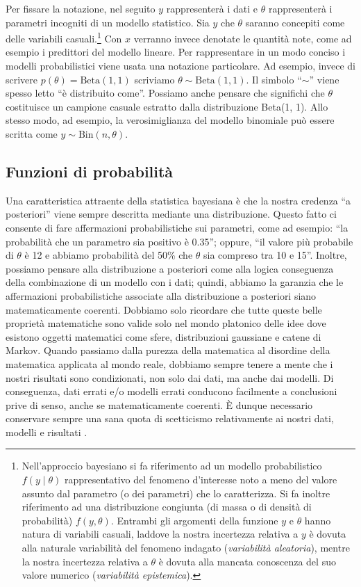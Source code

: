 \documentclass[
  11pt,
]{krantz}
\theoremstyle{definition}
\theoremstyle{definition}
\theoremstyle{definition}
\theoremstyle{definition}
\theoremstyle{remark}
\begin{document}
Per fissare la notazione, nel seguito \(y\) rappresenterà i dati e \(\theta\) rappresenterà i parametri incogniti di un modello statistico. Sia \(y\) che \(\theta\) saranno concepiti come delle variabili casuali.\footnote{Nell'approccio bayesiano si fa riferimento ad un modello probabilistico \(f(y \mid \theta)\) rappresentativo del fenomeno d'interesse noto a meno del valore assunto dal parametro (o dei parametri) che lo caratterizza. Si fa inoltre riferimento ad una distribuzione congiunta (di massa o di densità di probabilità) \(f(y, \theta)\). Entrambi gli argomenti della funzione \(y\) e \(\theta\) hanno natura di variabili casuali, laddove la nostra incertezza relativa a \(y\) è dovuta alla naturale variabilità del fenomeno indagato (\emph{variabilità aleatoria}), mentre la nostra incertezza relativa a \(\theta\) è dovuta alla mancata conoscenza del suo valore numerico (\emph{variabilità epistemica}).} Con \(x\) verranno invece denotate le quantità note, come ad esempio i predittori del modello lineare. Per rappresentare in un modo conciso i modelli probabilistici viene usata una notazione particolare. Ad esempio, invece di scrivere \(p(\theta) = \mbox{Beta}(1, 1)\) scriviamo \(\theta \sim \mbox{Beta}(1, 1)\). Il simbolo ``\(\sim\)'' viene spesso letto ``è distribuito come''. Possiamo anche pensare che significhi che \(\theta\) costituisce un campione casuale estratto dalla distribuzione Beta(1, 1). Allo stesso modo, ad esempio, la verosimiglianza del modello binomiale può essere scritta come \(y \sim \text{Bin}(n, \theta)\).

\hypertarget{funzioni-di-probabilituxe0}{%
\subsection{Funzioni di probabilità}\label{funzioni-di-probabilituxe0}}

Una caratteristica attraente della statistica bayesiana è che la nostra credenza ``a posteriori'' viene sempre descritta mediante una distribuzione. Questo fatto ci consente di fare affermazioni probabilistiche sui parametri, come ad esempio: ``la probabilità che un parametro sia positivo è 0.35''; oppure, ``il valore più probabile di \(\theta\) è 12 e abbiamo probabilità del 50\% che \(\theta\) sia compreso tra 10 e 15''. Inoltre, possiamo pensare alla distribuzione a posteriori come alla logica conseguenza della combinazione di un modello con i dati; quindi, abbiamo la garanzia che le affermazioni probabilistiche associate alla distribuzione a posteriori siano matematicamente coerenti. Dobbiamo solo ricordare che tutte queste belle proprietà matematiche sono valide solo nel mondo platonico delle idee dove esistono oggetti matematici come sfere, distribuzioni gaussiane e catene di Markov. Quando passiamo dalla purezza della matematica al disordine della matematica applicata al mondo reale, dobbiamo sempre tenere a mente che i nostri risultati sono condizionati, non solo dai dati, ma anche dai modelli. Di conseguenza, dati errati e/o modelli errati conducono facilmente a conclusioni prive di senso, anche se matematicamente coerenti. È dunque necessario conservare sempre una sana quota di scetticismo relativamente ai nostri dati, modelli e risultati \citep{martin2022bayesian}.
\end{document}
